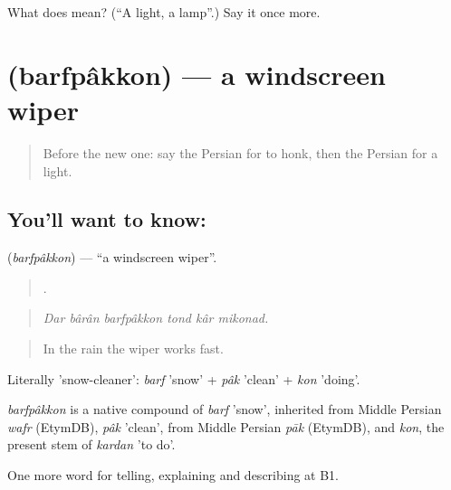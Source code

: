 \begin{tcolorbox}[breakable,colback=teal!4,colframe=teal!35!black,title={Before you move on}]
What does  mean? (\textquotedblleft{}A light, a lamp\textquotedblright{}.) Say it once more.
\end{tcolorbox}
\section[\texorpdfstring{\fa{برف} \fa{پاک} \fa{کن} (barfpâkkon)}{برف پاک کن (barfpâkkon)}]{   (barfpâkkon) — a windscreen wiper}

\label{lesson:FA-C421-barfpakkon}



\begin{quote}
Before the new one: say the Persian for to honk, then the Persian for a light.
\end{quote}

\subsection*{You'll want to know:   }
\textbf{  } (\emph{barfpâkkon}) — \textquotedblleft{}a windscreen wiper\textquotedblright{}.

\begin{quote}
       .
\end{quote}

\begin{quote}
\emph{Dar bârân barfpâkkon tond kâr mikonad.}
\end{quote}

\begin{quote}
In the rain the wiper works fast.
\end{quote}

Literally 'snow-cleaner': \emph{barf} 'snow' + \emph{pâk} 'clean' + \emph{kon} 'doing'.

\begin{cousinweb}
\emph{barfpâkkon} is a native compound of \emph{barf} 'snow', inherited from Middle Persian \emph{wafr} (EtymDB), \emph{pâk} 'clean', from Middle Persian \emph{pāk} (EtymDB), and \emph{kon}, the present stem of \emph{kardan} 'to do'.
\end{cousinweb}

\begin{grammarlens}[title={What you've built}]
One more word for telling, explaining and describing at B1.
\end{grammarlens}

